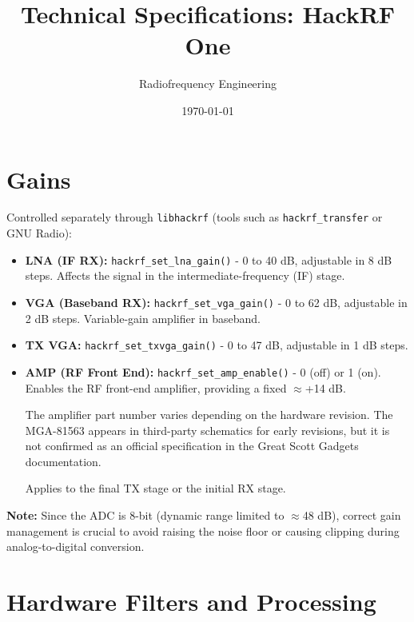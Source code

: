 \documentclass[11pt]{article}
\title{Technical Specifications: HackRF One}
\author{Radiofrequency Engineering}
\date{\today}
\begin{document}
\maketitle
\tableofcontents
\newpage

\section{Gains}

Controlled separately through \texttt{libhackrf} (tools such as \texttt{hackrf\_transfer} or GNU Radio):

\begin{itemize}
    \item \textbf{LNA (IF RX):} \texttt{hackrf\_set\_lna\_gain()} - 0 to 40 dB, adjustable in 8 dB steps. Affects the signal in the intermediate-frequency (IF) stage.
    \item \textbf{VGA (Baseband RX):} \texttt{hackrf\_set\_vga\_gain()} - 0 to 62 dB, adjustable in 2 dB steps. Variable-gain amplifier in baseband.
    \item \textbf{TX VGA:} \texttt{hackrf\_set\_txvga\_gain()} - 0 to 47 dB, adjustable in 1 dB steps.
    \item \textbf{AMP (RF Front End):} \texttt{hackrf\_set\_amp\_enable()} - 0 (off) or 1 (on). Enables the RF front-end amplifier, providing a fixed $\approx$+14 dB.
    \begin{pendingbox}
    The amplifier part number varies depending on the hardware revision. The MGA-81563 appears in third-party schematics for early revisions, but it is not confirmed as an official specification in the Great Scott Gadgets documentation.
    \end{pendingbox}
    Applies to the final TX stage or the initial RX stage.
\end{itemize}

\textbf{Note:} Since the ADC is 8-bit (dynamic range limited to $\approx$48 dB), correct gain management is crucial to avoid raising the noise floor or causing clipping during analog-to-digital conversion.

\section{Hardware Filters and Processing}
\end{document}
